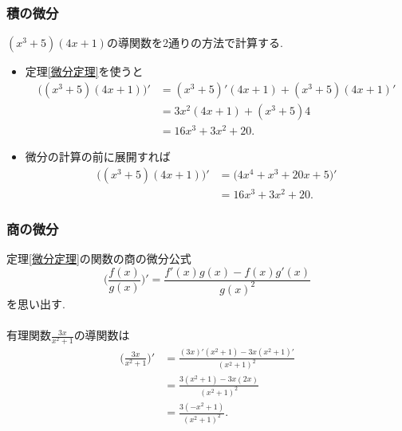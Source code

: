 

\begin{frame}
\frametitle{積の微分}

$(x^3+5)(4x+1)$の導関数を2通りの方法で計算する. 

\begin{itemize}
\item 定理\ref{微分定理}を使うと
\begin{align*}
\big((x^3+5)(4x+1)\big)'&=(x^3+5)'(4x+1)+(x^3+5)(4x+1)' \\
&= 3x^2(4x+1)+(x^3+5)4 \\
&= 16x^3+3x^2+20. 
\end{align*}
\item 微分の計算の前に展開すれば
\begin{align*}
\big((x^3+5)(4x+1)\big)'&= \big(4x^4+x^3+20x+5\big)' \\
&= 16x^3+3x^2+20. 
\end{align*}
\end{itemize}

\end{frame}





\begin{frame}
\frametitle{商の微分}

定理\ref{微分定理}の関数の商の微分公式
$$
\Big(\frac{f(x)}{g(x)}\Big)'=\frac{f'(x)g(x)-f(x)g'(x)}{g(x)^2}
$$
を思い出す. \\
\ \\

有理関数$\frac{3x}{x^2+1}$の導関数は
\begin{align*}
\Big(\frac{3x}{x^2+1}\Big)' &= \frac{(3x)'(x^2+1)-3x(x^2+1)'}{(x^2+1)^2} \\
& = \frac{3(x^2+1)-3x(2x)}{(x^2+1)^2} \\
&=  \frac{3(-x^2+1)}{(x^2+1)^2}. 
\end{align*}


\end{frame}




